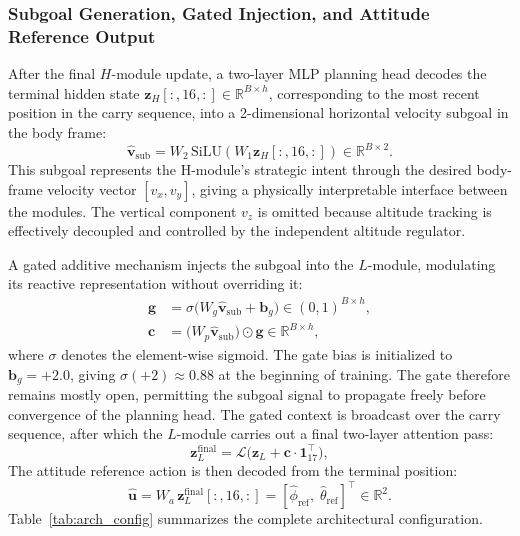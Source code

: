 \documentclass[12pt, a4paper]{article}
\begin{document}
\subsubsection{Subgoal Generation, Gated Injection, and Attitude Reference Output}
\label{sec:subgoal}

After the final $H$-module update, a two-layer MLP planning head decodes the terminal hidden state $\mathbf{z}_H[:,16,:] \in \mathbb{R}^{B \times h}$, corresponding to the most recent position in the carry sequence, into a 2-dimensional horizontal velocity subgoal in the body frame:
\begin{equation}
    \hat{\mathbf{v}}_{\mathrm{sub}} = W_2\,\mathrm{SiLU}(W_1 \mathbf{z}_H[:,16,:]) \in \mathbb{R}^{B \times 2}.
\end{equation}
This subgoal represents the H-module's strategic intent through the desired body-frame velocity vector $[v_x, v_y]$, giving a physically interpretable interface between the modules.
The vertical component $v_z$ is omitted because altitude tracking is effectively decoupled and controlled by the independent altitude regulator.

A gated additive mechanism injects the subgoal into the $L$-module, modulating its reactive representation without overriding it:
\begin{align}
    \mathbf{g} &= \sigma\bigl(W_g \hat{\mathbf{v}}_{\mathrm{sub}} + \mathbf{b}_g\bigr) \in (0,1)^{B \times h}, \label{eq:gate} \\
    \mathbf{c} &= \bigl(W_p \hat{\mathbf{v}}_{\mathrm{sub}}\bigr) \odot \mathbf{g} \in \mathbb{R}^{B \times h}, \label{eq:context}
\end{align}
where $\sigma$ denotes the element-wise sigmoid.
The gate bias is initialized to $\mathbf{b}_g = +2.0$, giving $\sigma(+2) \approx 0.88$ at the beginning of training.
The gate therefore remains mostly open, permitting the subgoal signal to propagate freely before convergence of the planning head.
The gated context is broadcast over the carry sequence, after which the $L$-module carries out a final two-layer attention pass:
\begin{equation}
    \mathbf{z}_L^{\mathrm{final}} = \mathcal{L}\bigl(\mathbf{z}_L + \mathbf{c}\cdot\mathbf{1}_{17}^{\top}\bigr),
\end{equation}
The attitude reference action is then decoded from the terminal position:
\begin{equation}
    \hat{\mathbf{u}} = W_a\,\mathbf{z}_L^{\mathrm{final}}[:,16,:] = [\hat{\phi}_{\mathrm{ref}},\; \hat{\theta}_{\mathrm{ref}}]^{\top} \in \mathbb{R}^{2}.
\end{equation}
Table~\ref{tab:arch_config} summarizes the complete architectural configuration.
\end{document}
